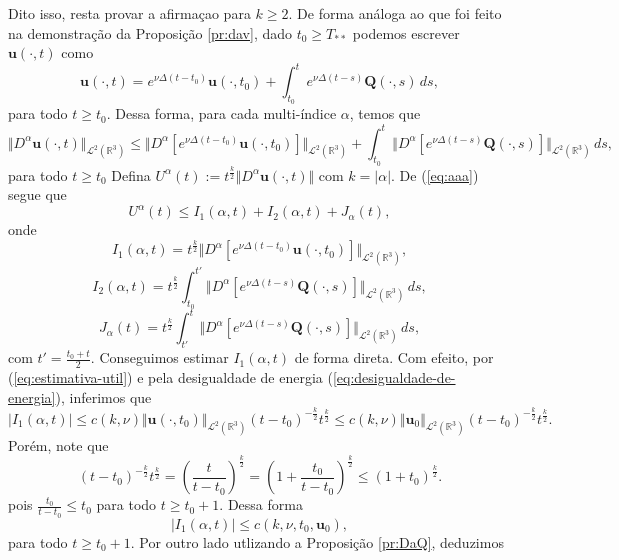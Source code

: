 \documentclass[a4paper, 11pt]{book}
\theoremstyle{definition}
\newcommand{\bR}{\mathbb{R}}
\newcommand{\bu}{\mathbf{u}}
\newcommand{\BQ}{\mathbf{Q}}
\newcommand{\cL}{\mathcal{L}}
\begin{document}
\begin{prf}
    Dito isso, resta provar a afirmaçao para $k \geqslant 2$. De forma análoga ao que foi feito na demonstração da Proposição \ref{pr:dav}, dado $t_0 \geqslant T_{**}$ podemos escrever $\bu(\cdot,t)$ como
    \[
        \bu(\cdot,t) = e^{\nu \Delta(t-t_0)} \bu(\cdot,t_0) + \int_{t_0}^{t} e^{\nu \Delta (t-s)} \BQ(\cdot,s) \,ds,
    \]
    para todo $t \geqslant t_0$.
    Dessa forma, para cada multi-índice $\alpha$, temos que
    \begin{equation} \label{eq:aaa}
        \Vert D^\alpha \bu(\cdot,t) \Vert_{\cL^2(\bR^3)} \leqslant \Vert D^\alpha [ e^{\nu \Delta(t-t_0)} \bu(\cdot,t_0)] \Vert_{\cL^2(\bR^3)} + \int_{t_0}^t \Vert D^\alpha [e^{\nu \Delta (t-s)} \BQ(\cdot,s)] \Vert_{\cL^2(\bR^3)} \,ds,
    \end{equation}
    para todo $t \geqslant t_0$
    Defina $U^\alpha(t) := t^{\frac{k}{2}} \Vert D^\alpha \bu(\cdot,t) \Vert$ com $k = |\alpha|$.
    De (\ref{eq:aaa}) segue que
    \[
        U^\alpha(t) \leqslant I_1(\alpha,t) + I_2(\alpha,t) + J_\alpha(t),
    \]
    onde
    \[
        I_1(\alpha,t) = t^{\frac{k}{2}}\Vert D^\alpha [ e^{\nu \Delta(t-t_0)} \bu(\cdot,t_0)] \Vert_{\cL^2(\bR^3)},
    \]
    \[
        I_2(\alpha,t) = t^{\frac{k}{2}}\int_{t_0}^{t'} \Vert D^\alpha [e^{\nu \Delta (t-s)} \BQ(\cdot,s)] \Vert_{\cL^2(\bR^3)} \,ds,
    \]
    \[
        J_\alpha(t) = t^{\frac{k}{2}}\int_{t'}^t \Vert D^\alpha [e^{\nu \Delta (t-s)} \BQ(\cdot,s)] \Vert_{\cL^2(\bR^3)} \,ds,
    \]
    com $t' = \frac{t_0 + t}{2}$. Conseguimos estimar $I_1(\alpha, t)$ de forma direta.
    Com efeito, por (\ref{eq:estimativa-util}) e pela desigualdade de energia (\ref{eq:desigualdade-de-energia}), inferimos que
    \[
        |I_1(\alpha,t)| \leqslant c(k,\nu) \Vert \bu(\cdot,t_0) \Vert_{\cL^2(\bR^3)} (t - t_0)^{-\frac{k}{2}} t^{\frac{k}{2}} \leqslant c(k, \nu) \Vert \bu_0 \Vert_{\cL^2(\bR^3)} (t - t_0)^{-\frac{k}{2}} t^{\frac{k}{2}}.
    \]
    Porém, note que
    \begin{equation} \label{eq:xxxx}
        (t - t_0)^{-\frac{k}{2}} t^{\frac{k}{2}} = \left( \frac{t}{t - t_0} \right)^{\! \frac{k}{2}} = \left( 1 + \frac{t_0}{t - t_0} \right)^{\! \frac{k}{2}} \leqslant (1 + t_0)^{\frac{k}{2}}.
    \end{equation}
    pois $\frac{t_0}{t - t_0} \leqslant t_0$ para todo $t \geqslant t_0 + 1$. Dessa forma
    \begin{equation} \label{eq:W1}
        |I_1(\alpha,t)| \leqslant c(k,\nu,t_0,\bu_0),
    \end{equation}
    para todo $t \geqslant t_0 + 1$. Por outro lado utlizando a Proposição \ref{pr:DaQ}, deduzimos

\end{prf}
\end{document}
